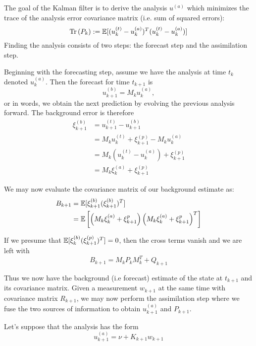 The goal of the Kalman filter is to derive the analysis $u^{(a)}$ which minimizes the trace of the analysis error covariance matrix (i.e. sum of squared errors):
\begin{equation}
    \mathrm{Tr}\left( P_k\right) := \mathbb{E}[(u_k^{(t)}-u_k^{(a)})^T(u_k^{(t)}-u_k^{(a)})]
\end{equation}
Finding the analysis consists of two steps: the forecast step and the assimilation step.

Beginning with the forecasting step, assume we have the analysis at time $t_k$ denoted $u_k^{(a)}$. Then the forecast for time $t_{k+1}$ is
\begin{equation}
    u_{k+1}^{(b)} = M_ku_k^{(a)},
\end{equation}
or in words, we obtain the next prediction by evolving the previous analysis forward. The background error is therefore
\begin{align}
    \xi_{k+1}^{(b)} &= u_{k+1}^{(t)} - u_{k+1}^{(b)} \\
    &= M_ku_k^{(t)}+\xi_{k+1}^{(p)} - M_{k}u_k^{(a)} \\
    &= M_k\left(u_k^{(t)}-u_k^{(a)} \right) + \xi_{k+1}^{(p)} \\
    &= M_k\xi_k^{(a)} + \xi_{k+1}^{(p)}
\end{align}

We may now evaluate the covariance matrix of our background estimate as:
\begin{align}
    B_{k+1} &= \mathbb{E}[\xi_{k+1}^{(b)}(\xi_{k+1}^{(b)})^T] \\
    &= \mathbb{E}\left[\left(M_k\xi_k^{(a)} + \xi_{k+1}^p \right) \left(M_k\xi_k^{(a)} + \xi_{k+1}^p \right)^T \right] \\
\end{align}

If we presume that $\mathbb{E}[\xi_k^{(b)}(\xi_{k+1}^{(p)})^T] = 0$, then the cross terms vanish and we are left with
\begin{equation}
    \boxed{B_{k+1} = M_kP_kM_k^T + Q_{k+1}}
\end{equation}

Thus we now have the background (i.e forecast) estimate of the state at $t_{k+1}$ and its covariance matrix. Given a measurement $w_{k+1}$ at the same time with covariance matrix $R_{k+1}$, we may now perform the assimilation step where we fuse the two sources of information to obtain $u_{k+1}^{(a)}$ and $P_{k+1}$.

Let's suppose that the analysis has the form
\begin{equation}
    u_{k+1}^{(a)} = \nu + K_{k+1}w_{k+1}
\end{equation}

